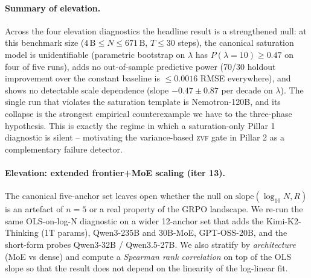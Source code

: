 \documentclass{article}
\begin{document}
\paragraph{Summary of elevation.}
\label{par:scaling-summary}
Across the four elevation diagnostics the headline result is a
strengthened null: at this benchmark size
($4\,\text{B} \le N \le 671\,\text{B}$, $T \le 30$ steps), the
canonical saturation model is unidentifiable (parametric bootstrap
on $\lambda$ has $P(\lambda = 10) \ge 0.47$ on four of five runs),
adds no out-of-sample predictive power (70/30 holdout improvement
over the constant baseline is $\le 0.0016$ RMSE everywhere), and
shows no detectable scale dependence (slope $-0.47 \pm 0.87$ per
decade on $\lambda$).  The single run that violates the saturation
template is Nemotron-120B, and its collapse is the strongest
empirical counterexample we have to the three-phase hypothesis.
This is exactly the regime in which a saturation-only Pillar 1
diagnostic is silent -- motivating the variance-based
\textsc{zvf} gate in Pillar 2 as a complementary failure detector.

\paragraph{Elevation: extended frontier+MoE scaling (iter 13).}
\label{par:scaling-extended}
The canonical five-anchor set leaves open whether the null on
$\text{slope}(\log_{10}N, R)$ is an artefact of $n = 5$ or a real
property of the GRPO landscape.  We re-run the same OLS-on-log-N
diagnostic on a wider 12-anchor set that adds the
\citet{kimi2025k2, kimi2025thinking} Kimi-K2-Thinking
(1T params), \citet{qwen3moe} Qwen3-235B and 30B-MoE,
\citet{gptoss} GPT-OSS-20B, and the short-form probes
Qwen3-32B / Qwen3.5-27B.  We also stratify by
\emph{architecture} (MoE vs dense) and compute a
\emph{Spearman rank correlation} on top of the OLS slope so that
the result does not depend on the linearity of the log-linear fit.
\end{document}
